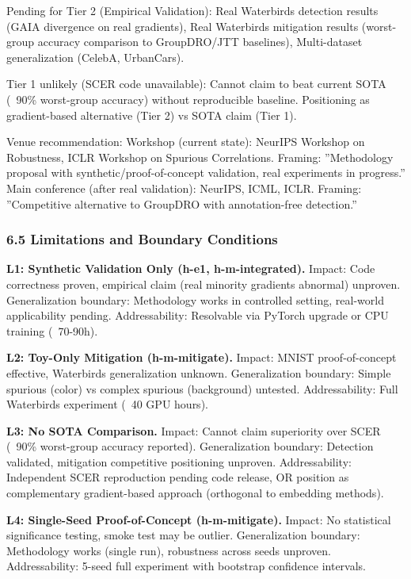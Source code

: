 Pending for Tier 2 (Empirical Validation): Real Waterbirds detection results (GAIA divergence on real gradients), Real Waterbirds mitigation results (worst-group accuracy comparison to GroupDRO/JTT baselines), Multi-dataset generalization (CelebA, UrbanCars).

Tier 1 unlikely (SCER code unavailable): Cannot claim to beat current SOTA (~90\% worst-group accuracy) without reproducible baseline. Positioning as gradient-based alternative (Tier 2) vs SOTA claim (Tier 1).

Venue recommendation: Workshop (current state): NeurIPS Workshop on Robustness, ICLR Workshop on Spurious Correlations. Framing: ''Methodology proposal with synthetic/proof-of-concept validation, real experiments in progress.'' Main conference (after real validation): NeurIPS, ICML, ICLR. Framing: ''Competitive alternative to GroupDRO with annotation-free detection.''

\subsubsection{6.5 Limitations and Boundary Conditions}

\textbf{L1: Synthetic Validation Only (h-e1, h-m-integrated).} Impact: Code correctness proven, empirical claim (real minority gradients abnormal) unproven. Generalization boundary: Methodology works in controlled setting, real-world applicability pending. Addressability: Resolvable via PyTorch upgrade or CPU training (~70-90h).

\textbf{L2: Toy-Only Mitigation (h-m-mitigate).} Impact: MNIST proof-of-concept effective, Waterbirds generalization unknown. Generalization boundary: Simple spurious (color) vs complex spurious (background) untested. Addressability: Full Waterbirds experiment (~40 GPU hours).

\textbf{L3: No SOTA Comparison.} Impact: Cannot claim superiority over SCER (~90\% worst-group accuracy reported). Generalization boundary: Detection validated, mitigation competitive positioning unproven. Addressability: Independent SCER reproduction pending code release, OR position as complementary gradient-based approach (orthogonal to embedding methods).

\textbf{L4: Single-Seed Proof-of-Concept (h-m-mitigate).} Impact: No statistical significance testing, smoke test may be outlier. Generalization boundary: Methodology works (single run), robustness across seeds unproven. Addressability: 5-seed full experiment with bootstrap confidence intervals.

